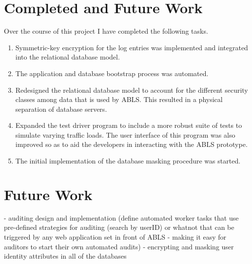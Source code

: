 \documentclass{sig-alternate}
\begin{document}


\section{Completed and Future Work}
Over the course of this project I have completed the following tasks.


\begin{enumerate}
	\item Symmetric-key encryption for the log entries was implemented and integrated into the relational database model.
	\item The application and database bootstrap process was automated.
	\item Redesigned the relational database model to account for the different security classes among data that is used by ABLS. This resulted in a physical separation of database servers.
	\item Expanded the test driver program to include a more robust suite of tests to simulate varying traffic loads. The user interface of this program was also improved so as to aid the developers in interacting with the ABLS prototype.
	\item The initial implementation of the database masking procedure was started.
\end{enumerate}

\section{Future Work}


- auditing design and implementation (define automated worker tasks that use pre-defined strategies for
auditing (search by userID) or whatnot that can be triggered by any web application set in front of ABLS - 
making it easy for auditors to start their own automated audits)
- encrypting and masking user identity attributes in all of the databases
\end{document}
